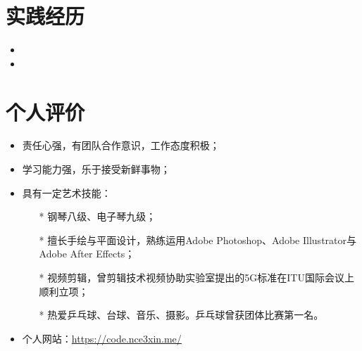 \documentclass{resume}
\begin{document}
\section{实践经历}
\begin{itemize}[parsep=0.5ex]
  \item {}
  \item {}
\end{itemize}

\section{个人评价}
\begin{itemize}[parsep=0.5ex]
  \item 责任心强，有团队合作意识，工作态度积极；
  \item 学习能力强，乐于接受新鲜事物；
  \item 具有一定艺术技能：
  \begin{itemize}[parsep=0.5ex]
    \item[*] 钢琴八级、电子琴九级；
    \item[*] 擅长手绘与平面设计，熟练运用Adobe Photoshop、Adobe Illustrator与Adobe After Effects；
    \item[*] 视频剪辑，曾剪辑技术视频协助实验室提出的5G标准在ITU国际会议上顺利立项；
    \item[*] 热爱乒乓球、台球、音乐、摄影。乒乓球曾获团体比赛第一名。
  \end{itemize}
  \item 个人网站：\href{https://code.nce3xin.me/}{https://code.nce3xin.me/}
\end{itemize}

%
%
\end{document}

